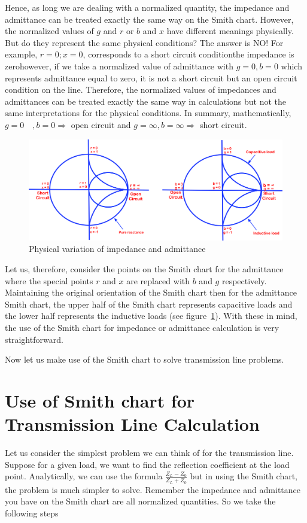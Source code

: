 Hence, as long we are dealing with a normalized quantity, the impedance and admittance can be treated exactly the same way on the Smith chart. However, the normalized values of $g$ and $r$ or $b$ and $x$ have different meanings physically. But do they represent the same physical conditions? The answer is NO! For example, $r = 0; x = 0$, corresponds to a short circuit condition\textemdash\;the impedance is zero\textemdash\;however, if we take a normalized value of admittance with $g=0, b=0$ which represents admittance equal to zero, it is not a short circuit but an open circuit condition on the line. Therefore, the normalized values of impedances and admittances can be treated exactly the same way in calculations but not the same interpretations for the physical conditions. In summary, mathematically, $g = 0\quad, b = 0\Longrightarrow$ open circuit and $g = \infty, b = \infty \Longrightarrow$ short circuit. 
\begin{figure}[h]
\centering
\includegraphics[width=1\linewidth]{./graphics/jnbkvfld}
\caption{Physical variation of impedance and admittance}
\label{fig:jnbkvfld}
\end{figure}

Let us, therefore, consider the points on the Smith chart for the admittance where the special points $r$ and $x$ are replaced with $b$ and $g$ respectively. Maintaining the original orientation of the Smith chart then for the admittance Smith chart, the upper half of the Smith chart represents capacitive loads and the lower half represents the inductive loads (see figure~\ref{fig:jnbkvfld}). With these in mind, the use of the Smith chart for impedance or admittance calculation is very straightforward.

Now let us make use of the Smith chart to solve transmission line problems. 

\section{Use of Smith chart for Transmission Line Calculation}
Let us consider the simplest problem we can think of for the transmission line. Suppose for a given load, we want to find the reflection coefficient at the load point. Analytically, we can use the formula $\frac{Z_L - Z_0}{Z_L + Z_0}$ but in using the Smith chart, the problem is much simpler to solve. Remember the impedance and admittance you have on the Smith chart are all normalized quantities. So we take the following steps

